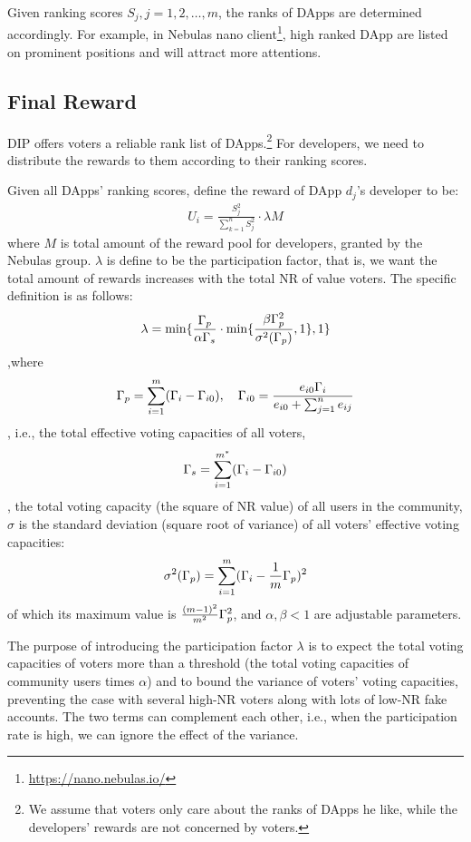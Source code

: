 Given ranking scores $S_j,j=1,2,\ldots,m$, the ranks of DApps are determined accordingly. For example, in Nebulas nano client\footnote{\url{https://nano.nebulas.io/}}, high ranked DApp are listed on prominent positions and will attract more attentions.

\subsection{Final Reward}
DIP offers voters a reliable rank list of DApps.\footnote{We assume that voters only care about the ranks of DApps he like, while the developers' rewards are not concerned by voters.} For developers, we need to distribute the rewards to them according to their ranking scores.

Given all DApps' ranking scores, define the reward of DApp $d_j$'s developer to be:
\begin{align}
	\label{eq:distribution}
	U_i = \frac{S_j^2}{\sum_{k=1}^n S_j^2}\cdot \lambda M
\end{align}
where $M$ is  total amount of the reward pool for developers, granted by the Nebulas group. $\lambda $ is define to be the participation factor, that is, we want the total amount of rewards increases with the total NR of value voters. The specific definition is as follows:
\begin{align}
	\lambda=\min\{\frac{\Gamma_p}{\alpha \Gamma_s }\cdot \min\{\frac{\beta\Gamma_p^2 }{\sigma^2(\Gamma_p)},1\},1\}
\end{align}
,where $$\Gamma_p = \sum_{i=1}^m (\Gamma_i-\Gamma_{i0}),\quad \Gamma_{i0} = \frac{e_{i0}\Gamma_i}{e_{i0}+\sum_{j=1}^n {e_{ij}}}$$, i.e., the total effective voting capacities of all voters,
$$\Gamma_s = \sum_{i=1}^{m^*} (\Gamma_i-\Gamma_{i0})$$,
the total voting capacity (the square of NR value) of all users in the community, $\sigma$ is the standard deviation (square root of variance) of all voters' effective voting capacities:
$$ \sigma^2(\Gamma_p) = \sum_{i=1}^m (\Gamma_i-\frac{1}{m}\Gamma_p)^2 $$
of which its maximum value is $\frac{(m-1)^2}{m^2}\Gamma_p^2$, and $\alpha,\beta < 1$ are adjustable parameters.

The purpose of introducing the participation factor $\lambda$ is to expect the total voting capacities of voters more than a threshold (the total voting capacities of  community users times $\alpha$)  and to bound the variance of voters’ voting capacities, preventing the case with several high-NR voters along with lots of low-NR fake accounts. The two terms can complement each other, i.e., when the participation rate is high, we can ignore the effect of the variance.
